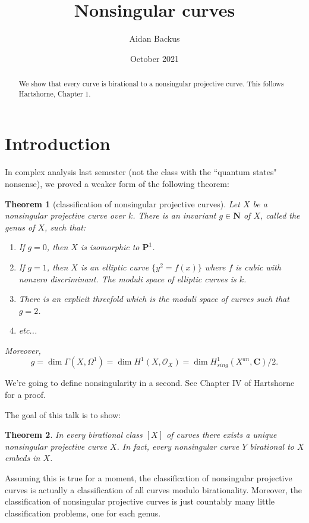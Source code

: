 \documentclass[reqno,12pt,letterpaper]{amsart}
\title{Nonsingular curves}
\author{Aidan Backus}
\date{October 2021}
\newcommand{\NN}{\mathbf{N}}
\newcommand{\CC}{\mathbf{C}}
\newcommand{\PP}{\mathbf P}
\newcommand{\Olo}{\mathscr O}
\newtheorem{theorem}{Theorem}[section]
\theoremstyle{definition}
\begin{document}
\begin{abstract}
We show that every curve is birational to a nonsingular projective curve.
This follows Hartshorne, Chapter 1.
\end{abstract}

\maketitle


\section{Introduction}
In complex analysis last semester (not the class with the ``quantum states" nonsense), we proved a weaker form of the following theorem:

\begin{theorem}[classification of nonsingular projective curves]
Let $X$ be a nonsingular projective curve over $k$.
There is an invariant $g \in \NN$ of $X$, called the \emph{genus} of $X$, such that:
\begin{enumerate}
\item If $g = 0$, then $X$ is isomorphic to $\PP^1$.
\item If $g = 1$, then $X$ is an elliptic curve $\{y^2 = f(x)\}$ where $f$ is cubic with nonzero discriminant. The moduli space of elliptic curves is $k$.
\item There is an explicit threefold which is the moduli space of curves such that $g = 2$.
\item etc...
\end{enumerate}
Moreover,
$$g = \dim \Gamma(X, \Omega^1) = \dim H^1(X, \Olo_X) = \dim H^1_{sing}(X^{an}, \CC)/2.$$
\end{theorem}

We're going to define nonsingularity in a second.
See Chapter IV of Hartshorne for a proof.

The goal of this talk is to show:

\begin{theorem}
In every birational class $[X]$ of curves there exists a unique nonsingular projective curve $X$.
In fact, every nonsingular curve $Y$ birational to $X$ embeds in $X$.
\end{theorem}

Assuming this is true for a moment, the classification of nonsingular projective curves is actually a classification of all curves modulo birationality.
Moreover, the classification of nonsingular projective curves is just countably many little classification problems, one for each genus.
\end{document}
